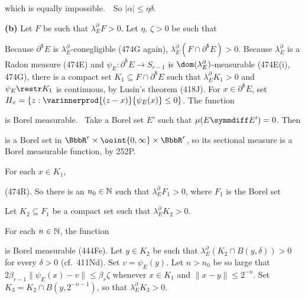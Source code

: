 {\noindent which is equally impossible.\ \BanG\   So
$|\alpha|\le\eta\delta$.\ \Qed

\medskip

{\bf (b)} Let $F$ be such that $\lambda^{\partial}_EF>0$.   Let $\eta$,
$\zeta>0$ be such that


\noindent Because $\partial^{\$}E$ is
$\lambda^{\partial}_E$-conegligible (474G again),
$\lambda^{\partial}_E(F\cap\partial^{\$}E)>0$.   Because
$\lambda^{\partial}_E$ is a Radon measure (474E) and
$\psi_E:\partial^{\$}E\to S_{r-1}$ is
$\dom(\lambda^{\partial}_E)$-measurable (474E(i), 474G), there is a
compact set
$K_1\subseteq F\cap\partial^{\$}E$ such that $\lambda^{\partial}_EK_1>0$
and $\psi_E\restr K_1$ is continuous, by Lusin's theorem (418J).   For
$x\in\partial^{\$}E$, set
$H_x=\{z:\varinnerprod{(z-x)}{\psi_E(x)}\le 0\}$.   The function


\noindent is Borel measurable.   \Prf\ Take a Borel set $E'$ such that
$\mu(E\symmdiff E')=0$.   Then


\noindent is a Borel set in
$\BbbR^r\times\ooint{0,\infty}\times\BbbR^r$, so its sectional measure
is a Borel measurable function, by 252P.\ \Qed

For each $x\in K_1$,


\noindent (474R).   So there is an $n_0\in\Bbb N$ such that
$\lambda^{\partial}_EF_1>0$, where $F_1$ is the Borel set


\noindent Let $K_2\subseteq F_1$ be a compact set such that
$\lambda^{\partial}_EK_2>0$.

For each $n\in\Bbb N$, the function


\noindent is Borel measurable (444Fe).   Let $y\in K_2$ be such that
$\lambda^{\partial}_E(K_2\cap B(y,\delta))>0$ for every $\delta>0$
(cf.\ 411Nd).   Set $v=\psi_E(y)$.   Let $n>n_0$ be so large that
$2\beta_{r-1}\|\psi_E(x)-v\|\le\beta_r\zeta$ whenever $x\in K_1$ and
$\|x-y\|\le 2^{-n}$.   Set $K_3=K_2\cap B(y,2^{-n-1})$, so that
$\lambda^{\partial}_EK_3>0$.

}
